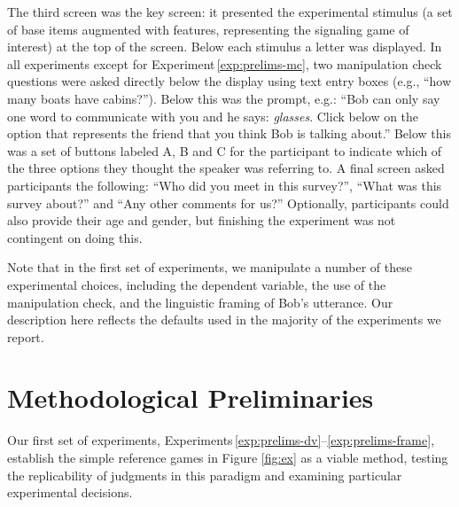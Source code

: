 \documentclass[man,noapacite]{apa2}
\newcounter{Experiment}
\newcommand{\exptref}[1]{Experiment\,\ref{#1}}
\newcommand{\exptrefrange}[2]{Experiments\,\ref{#1}--\ref{#2}}
\begin{document}
The third screen was the key screen: it presented the experimental stimulus (a set of base items augmented with features, representing the signaling game of interest) at the top of the screen. Below each stimulus a letter was displayed.
In all experiments except for \exptref{exp:prelims-mc}, two manipulation check questions were asked directly below the display using text entry boxes (e.g., ``how many boats have cabins?''). Below this was the prompt, e.g.: ``Bob can only say one word to communicate with you and he says: {\it glasses}. Click below on the option that represents the friend that you think Bob is talking about.'' Below this was a set of buttons labeled A, B and C for the participant to indicate which of the three options they thought the speaker was referring to. A final screen asked participants the following: ``Who did you meet in this survey?'',  ``What was this survey about?'' and ``Any other comments for us?'' Optionally, participants could also provide their age and gender, but finishing the experiment was not contingent on doing this.

Note that in the first set of experiments, we manipulate a number of these experimental choices, including the dependent variable, the use of the manipulation check, and the linguistic framing of Bob's utterance. Our description here reflects the defaults used in the majority of the experiments we report.



\section{Methodological Preliminaries}
\label{sec:prelims}

Our first set of experiments, \exptrefrange{exp:prelims-dv}{exp:prelims-frame}, establish the simple reference games in Figure \ref{fig:ex} as a viable method, testing the replicability of judgments in this paradigm and examining particular experimental decisions.
\end{document}
